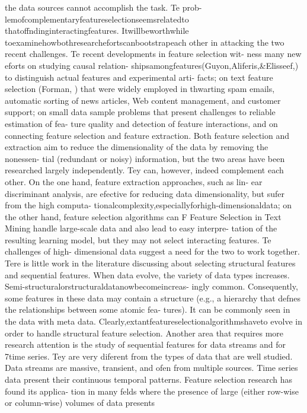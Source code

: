 the data sources cannot accomplish the task. 
Te prob-
lemofcomplementaryfeatureselectionseemsrelatedto
thatoffndinginteractingfeatures.
Itwillbeworthwhile
toexaminehowbothresearchefortscanbootstrapeach
other in attacking the two recent challenges.
Te recent developments in feature selection wit-
ness many new eforts on studying causal relation-
shipsamongfeatures(Guyon,Aliferis,\&Elisseef,)
to distinguish actual features and experimental arti-
facts; on text feature selection (Forman, ) that were
widely employed in thwarting spam emails, automatic
sorting of news articles, Web content management,
and customer support; on small data sample problems
that present challenges to reliable estimation of fea-
ture quality and detection of feature interactions, and
on connecting feature selection and feature extraction.
Both feature selection and extraction aim to reduce the
dimensionality of the data by removing the nonessen-
tial (redundant or noisy) information, but the two
areas have been researched largely independently. 
Tey
can, however, indeed complement each other. On the
one hand, feature extraction approaches, such as lin-
ear discriminant analysis, are efective for reducing
data dimensionality, but sufer from the high computa-
tionalcomplexity,especiallyforhigh-dimensionaldata;
on the other hand, feature selection algorithms can
 F Feature Selection in Text Mining
handle large-scale data and also lead to easy interpre-
tation of the resulting learning model, but they may
not select interacting features. 
Te challenges of high-
dimensional data suggest a need for the two to work
together.
Tere is little work in the literature discussing about
selecting structural features and sequential features.
When data evolve, the variety of data types increases.
Semi-structuralorstructuraldatanowbecomeincreas-
ingly common. 
Consequently, some features in these
data may contain a structure (e.g., a hierarchy that
defnes the relationships between some atomic fea-
tures). 
It can be commonly seen in the data with meta
data.
Clearly,extantfeatureselectionalgorithmshaveto
evolve in order to handle structural feature selection.
Another area that requires more research attention is
the study of sequential features for data streams and
for 7time series. 
Tey are very diferent from the types
of data that are well studied. Data streams are massive,
transient, and ofen from multiple sources. 
Time series
data present their continuous temporal patterns.
Feature selection research has found its applica-
tion in many felds where the presence of large (either
row-wise or column-wise) volumes of data presents
